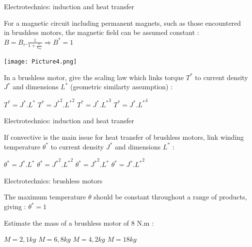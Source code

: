 \documentclass{webquiz}
\begin{document}
       
        \begin{question}
        
         \begin{center}
	\large{Electrotechnics: induction and heat transfer }
\end{center}
	 For a magnetic circuit including permanent magnets, such as those encountered in brushless motors, the magnetic field can be assumed constant : $B = B_r.\frac{1}{1+\frac{e}{L_m}} \Rightarrow B^* = 1$

	 \begin{center}
	\texttt{[image: Picture4.png]}
\end{center}

	In a brushless motor, give the scaling law which links torque $T^*$ to current density $J^*$ and dimensions $L^*$ (geometric similarty assumption) : 



     \begin{choice}
      \incorrect  $T^* = J^*.L^*$    
      \incorrect $T^* = {J^*}^{2}.{L^*}^2$    
     \incorrect $T^* = {J^*}.{L^*}^3$    
      \correct $T^* = {J^*}.{L^*}^4$    
     \end{choice} 
    
   \end{question}
      
  
        \begin{question}
        
	 \begin{center}
	\large{Electrotechnics: induction and heat transfer }
\end{center}
If convective is the main issue for heat transfer of brushless motors, link winding temperature $\theta^*$ to current density $J^*$ and dimensions $L^*$ : 


     \begin{choice}
      \incorrect  $\theta^* = J^*.L^*$    
      \incorrect $\theta^* = {J^*}^{2}.{L^*}^2$    
     \incorrect $\theta^* = {J^*}^2.{L^*}$    
      \correct $\theta^* = {J^*}.{L^*}^2$    
     \end{choice} 
    
   \end{question}

   \begin{question}
        
	 \begin{center}
	\large{Electrotechnics: brushless motors}
\end{center}
The maximum temperature $\theta$  should be constant throughout a range of products, giving :  $\theta^* = 1$  

Estimate the mass of a brushless motor of 8 N.m : 

     \begin{choice}
      \incorrect  $M = 2,1 kg$    
      \correct  $M = 6,8 kg$    
     \incorrect  $M = 4,2 kg$    
      \incorrect  $M = 18 kg$      
     \end{choice} 
    
   \end{question}
   
\end{document}
